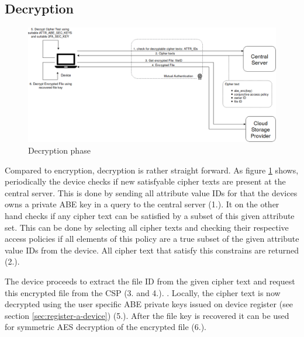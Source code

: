 \subsection{Decryption}

\begin{figure}[!t]
\centering
    \includegraphics[width=1.0\linewidth]{img/decryption.png}
    \caption{Decryption phase}
    \label{fig:tfdacmacs-decryption}
\end{figure}
Compared to encryption, decryption is rather straight forward. As figure \ref{fig:tfdacmacs-decryption} shows, periodically the device checks if new satisfyable cipher texts are present at the central server. This is done by sending all attribute value IDs for that the devices owns a private ABE key in a query to the central server (1.). It on the other hand checks if any cipher text can be satisfied by a subset of this given attribute set. This can be done by selecting all cipher texts and checking their respective access policies if all elements of this policy are a true subset of the given attribute value IDs from the device. All cipher text that satisfy this constrains are returned (2.).

The device proceeds to extract the file ID from the given cipher text and request this encrypted file from the CSP (3. and 4.). . Locally, the cipher text is now decrypted using the user specific ABE private keys issued on device register (see section \ref{sec:register-a-device}) (5.). After the file key is recovered it can be used for symmetric  AES decryption of the encrypted file (6.). 

